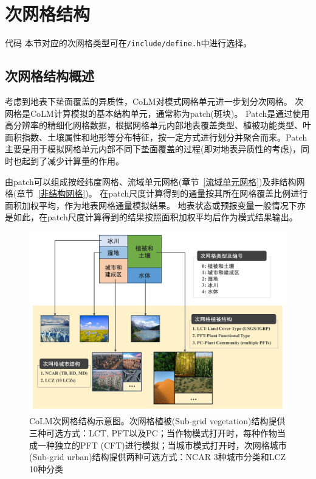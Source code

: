 \section{次网格结构}\label{次网格}
\begin{mymdframed}{代码}
  本节对应的次网格类型可在\texttt{/include/define.h}中进行选择。
\end{mymdframed}
\subsection{次网格结构概述}
考虑到地表下垫面覆盖的异质性，CoLM对模式网格单元进一步划分次网格。
次网格是CoLM计算模拟的基本结构单元，通常称为patch(斑块)。
Patch是通过使用高分辨率的精细化网格数据，根据网格单元内部地表覆盖类型、植被功能类型、叶面积指数、土壤属性和地形等分布特征，按一定方式进行划分并聚合而来。Patch主要是用于模拟网格单元内部不同下垫面覆盖的过程(即对地表异质性的考虑)，同时也起到了减少计算量的作用。


由patch可以组成按经纬度网格、流域单元网格(章节~\ref{流域单元网格})及非结构网格(章节~\ref{非结构网格})。
在patch尺度计算得到的通量按其所在网格覆盖比例进行面积加权平均，作为地表网格通量模拟结果。
地表状态或预报变量一般情况下亦是如此，在patch尺度计算得到的结果按照面积加权平均后作为模式结果输出。

{
  \begin{figure}[htbp]
    \centering
    \includegraphics[width=\textwidth]{Figures/模式构架/CoLM次网格结构示意图_v4.jpg}
    \caption[CoLM次网格结构示意图]{CoLM次网格结构示意图。次网格植被(Sub-grid vegetation)结构提供三种可选方式：LCT, PFT以及PC；当作物模式打开时，每种作物当成一种独立的PFT (CFT)进行模拟；当城市模式打开时，次网格城市(Sub-grid urban)结构提供两种可选方式：NCAR 3种城市分类和LCZ 10种分类}
    \label{fig:次网格结构示意图}
  \end{figure}
}


